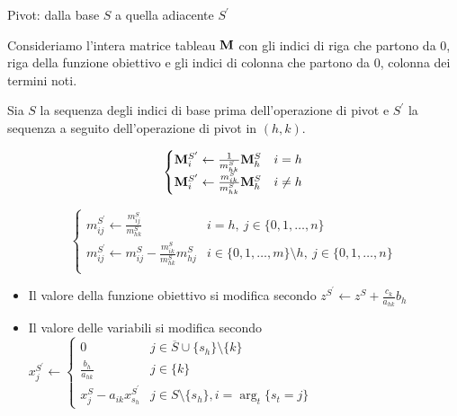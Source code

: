 \documentclass{beamer}
\begin{document}
\begin{frame}[fragile]{}

\end{frame}

\begin{frame}[allowframebreaks]{Pivot: dalla base $S$ a quella adiacente $S^\prime$ }

Consideriamo l'intera matrice tableau $\mathbf{M}$ con gli indici di
riga che partono da 0, riga della funzione obiettivo e gli indici
di colonna che partono da 0, colonna dei termini noti.

Sia $S$ la sequenza degli indici di base prima dell'operazione di
pivot e $S^\prime$ la sequenza a seguito dell'operazione di pivot
in $(h, k)$.

$$
\begin{cases}
\mathbf{M}^{S^\prime}_i \gets \frac{1}{m_{hk}^S} \mathbf{M}^{S}_h & i = h\\
\mathbf{M}^{S^\prime}_i \gets \frac{m_{ik}^S}{m_{hk}^S} \mathbf{M}^{S}_h & i \neq h\\
\end{cases}
$$

$$
\begin{cases}
m^{S^\prime}_{ij} \gets \frac{m_{ij}^S}{m_{hk}^S} & i = h,\ j\in\{0,1,\ldots,n\}\\
m^{S^\prime}_{ij} \gets m^{S}_{ij}-\frac{m_{ik}^S}{m_{hk}^S} m_{hj}^S & i \in \{0,1,\ldots,m\} \setminus h,\ j\in\{0,1,\ldots,n\}\\
\end{cases}
$$

\begin{itemize}
\item Il valore della funzione obiettivo si modifica secondo
$z^{S^\prime} \gets z^S + \frac{c_k}{a_{hk}} b_h$

\item Il valore delle variabili si modifica secondo
$
x_{j}^{S^\prime} \gets
\begin{cases}
0                  & j \in \overline{S} \cup \{s_h\} \setminus \{k\}\\
\frac{b_h}{a_{hk}} & j \in \{k\}\\
x_{j}^S-a_{ik} x_{s_h}^{S^\prime} & j \in S \setminus \{s_h\}, i = \arg_t \{s_t = j\}
\end{cases}
$


\end{itemize}
\end{frame}
\end{document}
